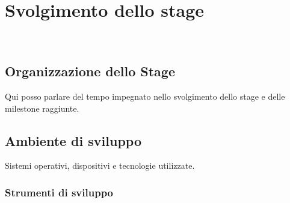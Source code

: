 
\chapter{Svolgimento dello stage}
\label{cap:descrizione-stage}

\\

\section{Organizzazione dello Stage}

Qui posso parlare del tempo impegnato nello svolgimento dello stage e delle milestone raggiunte.

\section{Ambiente di sviluppo}

Sistemi operativi, dispositivi e tecnologie utilizzate.

\subsection{Strumenti di sviluppo}

%

